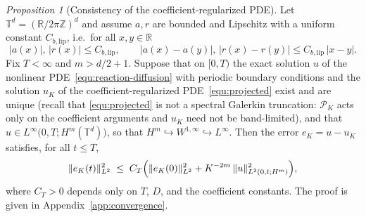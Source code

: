 \documentclass[a4paper,fleqn]{cas-sc}
\theoremstyle{definition}
\theoremstyle{remark}
\newtheorem{proposition}[theorem]{Proposition}
\begin{document}
\begin{proposition}[Consistency of the coefficient-regularized PDE]
\label{prop:u_u_K}
Let $\mathbb T^d=(\mathbb R/2\pi\mathbb Z)^d$ and assume $a,r$ are bounded and
Lipschitz with a uniform constant $C_{b,\mathrm{lip}}$, i.e.\ for all $x,y\in\mathbb R$
\[
|a(x)|,\,|r(x)|\le C_{b,\mathrm{lip}},\qquad
|a(x)-a(y)|,\,|r(x)-r(y)|\le C_{b,\mathrm{lip}}\,|x-y|.
\]
Fix $T<\infty$ and $m>d/2+1$. Suppose that on $[0,T)$ the exact solution $u$ of the
nonlinear PDE~\eqref{equ:reaction-diffusion} with periodic boundary conditions and
the solution $u_K$ of the coefficient-regularized PDE~\eqref{equ:projected} exist
and are unique (recall that \eqref{equ:projected} is not a spectral Galerkin
truncation: $\mathcal P_K$ acts only on the coefficient arguments and $u_K$ need not
be band-limited), and that $u\in L^\infty\bigl(0,T;H^m(\mathbb T^d)\bigr)$, so that
$H^m\hookrightarrow W^{1,\infty}\hookrightarrow L^\infty$. Then the error
$e_K=u-u_K$ satisfies, for all $t\le T$,
\begin{equation}\label{eq:prop-uuK-bound}
\|e_K(t)\|_{L^2}^2\;\le\; C_T\Bigl(\|e_K(0)\|_{L^2}^2
+ K^{-2m}\,\|u\|_{L^2(0,t;H^m)}^2\Bigr),
\end{equation}
where $C_T>0$ depends only on $T$, $D$, and the coefficient constants. The proof is
given in Appendix~\ref{app:convergence}.
\end{proposition}
\end{document}
